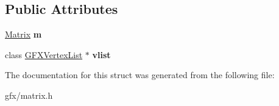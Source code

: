 \subsection*{Public Attributes}
\begin{DoxyCompactItemize}
\item 
\hyperlink{classMatrix}{Matrix} {\bfseries m}\hypertarget{structDrawContext_a3eec9e93475d95168d29bec7a192cd64}{}\label{structDrawContext_a3eec9e93475d95168d29bec7a192cd64}

\item 
class \hyperlink{classGFXVertexList}{G\+F\+X\+Vertex\+List} $\ast$ {\bfseries vlist}\hypertarget{structDrawContext_a32957367f0a6d63637ad849456095f96}{}\label{structDrawContext_a32957367f0a6d63637ad849456095f96}

\end{DoxyCompactItemize}


The documentation for this struct was generated from the following file\+:\begin{DoxyCompactItemize}
\item 
gfx/matrix.\+h\end{DoxyCompactItemize}
